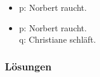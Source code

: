 {\begin{frame}
\begin{table}
\vspace{1em}

\begin{minipage}{0.4\textwidth}
\centering
\begin{itemize}
\item[] \small{p: Norbert raucht.}
\end{itemize}
\end{minipage}
%
\begin{minipage}{0.5\textwidth}
\centering
\begin{itemize}
\item[] \small{p: Norbert raucht.\\
q: Christiane schläft.}
\end{itemize}
\end{minipage}
\end{table}

\end{frame}

%

\begin{frame}
\frametitle{Lösungen}

\begin{table}


\end{table}
\end{frame}}
